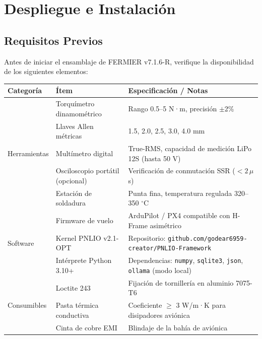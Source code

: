 \chapter{Despliegue e Instalación}

\section{Requisitos Previos}

Antes de iniciar el ensamblaje de FERMIER v7.1.6-R, verifique la disponibilidad de los siguientes elementos:

\begin{table}[h]
\centering
\begin{tabular}{|l|l|p{6cm}|}
\hline
\textbf{Categoría} & \textbf{Ítem} & \textbf{Especificación / Notas} \\ \hline
\multirow{5}{*}{Herramientas} 
 & Torquímetro dinamométrico & Rango 0.5--5 N·m, precisión $\pm$2\% \\ 
 & Llaves Allen métricas & 1.5, 2.0, 2.5, 3.0, 4.0 mm \\ 
 & Multímetro digital & True-RMS, capacidad de medición LiPo 12S (hasta 50 V) \\ 
 & Osciloscopio portátil (opcional) & Verificación de conmutación SSR ($<2\,\mu$s) \\ 
 & Estación de soldadura & Punta fina, temperatura regulada 320--350 $^\circ$C \\ \hline
\multirow{3}{*}{Software} 
 & Firmware de vuelo & ArduPilot / PX4 compatible con H-Frame asimétrico \\ 
 & Kernel PNLIO v2.1-OPT & Repositorio: \texttt{github.com/godear6959-creator/PNLIO-Framework} \\ 
 & Intérprete Python 3.10+ & Dependencias: \texttt{numpy}, \texttt{sqlite3}, \texttt{json}, \texttt{ollama} (modo local) \\ \hline
\multirow{3}{*}{Consumibles} 
 & Loctite 243 & Fijación de tornillería en aluminio 7075-T6 \\ 
 & Pasta térmica conductiva & Coeficiente $\geq$ 3 W/m·K para disipadores aviónica \\ 
 & Cinta de cobre EMI & Blindaje de la bahía de aviónica \\ \hline
\end{tabular}
\end{table}

